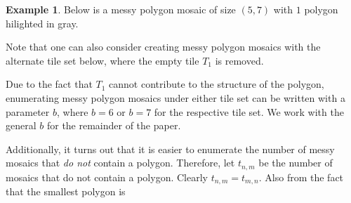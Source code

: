\documentclass[12pt]{article}
\theoremstyle{plain}
\theoremstyle{definition}
\theoremstyle{remark}
\theoremstyle{definition}
\newtheorem{exmp}{Example}[section]
\newcommand{\cell}[4]{ \draw[thick] ( #1 , #2 ) rectangle ( #3 , #4 );}
\newcommand{\cellA}[4]{ \draw[thick] ( #1 , #2 ) rectangle ( #3 , #4 ); \draw[red, thick, densely dotted] (#3 * 0.5 + #1 * 0.5 , #2) -- (#3, #4 * 0.5 + #2 * 0.5);}
\newcommand{\cellB}[4]{ \draw[thick] ( #1 , #2 ) rectangle ( #3 , #4 ); \draw[red, thick, densely dotted] (#3 * 0.5 + #1 * 0.5 , #2) -- (#1, #4 * 0.5 + #2 * 0.5);}
\newcommand{\cellC}[4]{ \draw[thick] ( #1 , #2 ) rectangle ( #3 , #4 ); \draw[red, thick, densely dotted] (#3 * 0.5 + #1 * 0.5 , #4) -- (#1, #4 * 0.5 + #2 * 0.5);}
\newcommand{\cellD}[4]{ \draw[thick] ( #1 , #2 ) rectangle ( #3 , #4 ); \draw[red, thick, densely dotted] (#3 * 0.5 + #1 * 0.5 , #4) -- (#3, #4 * 0.5 + #2 * 0.5);}
\newcommand{\cellE}[4]{ \draw[thick] ( #1 , #2 ) rectangle ( #3 , #4 ); \draw[red, thick, densely dotted] (#3 * 0.5 + #1 * 0.5 , #2) -- (#3 * 0.5 + #1 * 0.5 , #4);}
\newcommand{\cellF}[4]{ \draw[thick] ( #1 , #2 ) rectangle ( #3 , #4 ); \draw[red, thick, densely dotted] (#3, #4 * 0.5 + #2 * 0.5) -- (#1, #4 * 0.5 + #2 * 0.5);}
\newcommand{\cellAf}[4]{\filldraw[gray!40] ( #1 , #2 ) rectangle ( #3 , #4 ); \draw[thick] ( #1 , #2 ) rectangle ( #3 , #4 ); \draw[red, thick, densely dotted] (#3 * 0.5 + #1 * 0.5 , #2) -- (#3, #4 * 0.5 + #2 * 0.5);}
\newcommand{\cellBf}[4]{\filldraw[gray!40] ( #1 , #2 ) rectangle ( #3 , #4 ); \draw[thick] ( #1 , #2 ) rectangle ( #3 , #4 ); \draw[red, thick, densely dotted] (#3 * 0.5 + #1 * 0.5 , #2) -- (#1, #4 * 0.5 + #2 * 0.5);}
\newcommand{\cellCf}[4]{\filldraw[gray!40] ( #1 , #2 ) rectangle ( #3 , #4 ); \draw[thick] ( #1 , #2 ) rectangle ( #3 , #4 ); \draw[red, thick, densely dotted] (#3 * 0.5 + #1 * 0.5 , #4) -- (#1, #4 * 0.5 + #2 * 0.5);}
\newcommand{\cellDf}[4]{\filldraw[gray!40] ( #1 , #2 ) rectangle ( #3 , #4 ); \draw[thick] ( #1 , #2 ) rectangle ( #3 , #4 ); \draw[red, thick, densely dotted] (#3 * 0.5 + #1 * 0.5 , #4) -- (#3, #4 * 0.5 + #2 * 0.5);}
\newcommand{\cellEf}[4]{\filldraw[gray!40] ( #1 , #2 ) rectangle ( #3 , #4 ); \draw[thick] ( #1 , #2 ) rectangle ( #3 , #4 ); \draw[red, thick, densely dotted] (#3 * 0.5 + #1 * 0.5 , #2) -- (#3 * 0.5 + #1 * 0.5 , #4);}
\newcommand{\cellFf}[4]{\filldraw[gray!40] ( #1 , #2 ) rectangle ( #3 , #4 ); \draw[thick] ( #1 , #2 ) rectangle ( #3 , #4 ); \draw[red, thick, densely dotted] (#3, #4 * 0.5 + #2 * 0.5) -- (#1, #4 * 0.5 + #2 * 0.5);}
\begin{document}
\begin{exmp}
\label{exmp: messy sap}
Below is a messy polygon mosaic of size $(5,7)$ with $1$ polygon hilighted in gray. 

\begin{center}
\end{center}
\end{exmp}

Note that one can also consider creating messy polygon mosaics with the alternate tile set below, where the empty tile $T_1$ is removed.

\begin{center}
\end{center}

Due to the fact that $T_1$ cannot contribute to the structure of the polygon, enumerating messy polygon mosaics under either tile set can be written with a parameter $b$, where $b=6$ or $b=7$ for the respective tile set. We work with the general $b$ for the remainder of the paper.

Additionally, it turns out that it is easier to enumerate the number of messy mosaics that \textit{do not} contain a polygon. Therefore, let $t_{n,m}$ be the number of mosaics that do not contain a polygon. Clearly $t_{n,m}=t_{m,n}.$ Also from the fact that the smallest polygon is
\end{document}
